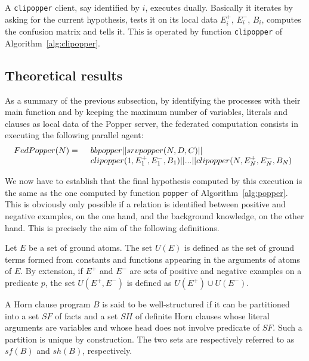 A \texttt{clipopper} client, say identified by $i$, executes dually. Basically it  
iterates by asking for the current hypothesis, tests it on its local
data $E_i^+$, $E_i^-$, $B_i$, computes the confusion matrix and tells it. This is operated by function \texttt{clipopper} of Algorithm~\ref{alg:clipopper}.




\subsection{Theoretical results}

As a summary of the previous subsection, by identifying the processes with their main function and by keeping the maximum number of variables, literals and clauses as local data of the Popper server, the federated computation consists in executing the following parallel agent:
%
\begin{eqnarray}
FedPopper(N) & = & \begin{array}[t]{l}
                     bbpopper || srvpopper(N, D, C) || \\
                     clipopper(1,E_1^+,E_1^-,B_1) || ... || 
                     clipopper(N,E_N^+,E_N^-,B_N)
                    \end{array}
\label{eqn-FedPopper}               
\end{eqnarray}

We now have to establish that the final hypothesis computed by this execution is the same as the one computed by function \texttt{popper} of Algorithm~\ref{alg:popper}. This is obviously only possible if a relation is identified between positive and negative examples, on the one hand, and the background knowledge, on the other hand. This is precisely the aim of the following definitions.

\begin{definition}
Let $E$ be a set of ground atoms. The set $U(E)$ is defined as the set of ground terms formed from constants and functions appearing in the arguments of atoms of $E$. By extension, if $E^+$ and $E^-$ are sets of positive and negative examples on a predicate $p$, the set $U(E^+,E^-)$ is defined as $U(E^+) \cup U(E^-)$.
\end{definition}

\begin{definition}
 A Horn clause program $B$ is said to be well-structured if it can be partitioned into a set $SF$ of facts and a set $SH$ of definite Horn clauses whose literal arguments are variables and whose head does not involve predicate of $SF$. Such a partition is unique by construction. The two sets are respectively referred to as
 $sf(B)$ and $sh(B)$, respectively.
\end{definition}

